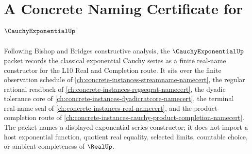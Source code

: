 \chapter{A Concrete Naming Certificate for $\CauchyExponentialUp$}
\label{ch:concrete-instances-cauchy-exponential-namecert}

Following Bishop and Bridges constructive analysis, the $\CauchyExponentialUp$ packet records the classical exponential Cauchy series as a finite real-name constructor for the L10 Real and Completion route. It sits over the finite observation schedule of \autoref{ch:concrete-instances-streamname-namecert}, the regular rational readback of \autoref{ch:concrete-instances-regseqrat-namecert}, the dyadic tolerance core of \autoref{ch:concrete-instances-dyadicratcore-namecert}, the terminal real-name seal of \autoref{ch:concrete-instances-real-namecert}, and the product-completion route of \autoref{ch:concrete-instances-cauchy-product-completion-namecert}. The packet names a displayed exponential-series constructor; it does not import a host exponential function, quotient real equality, selected limits, countable choice, or ambient completeness of $\RealUp$.

